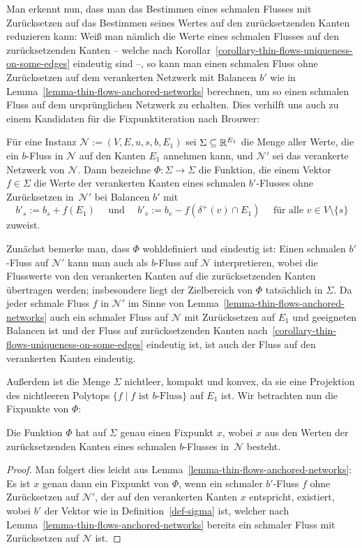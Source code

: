 Man erkennt nun, dass man das Bestimmen eines schmalen Flusses mit Zurücksetzen auf das Bestimmen seines Wertes auf den zurücksetzenden Kanten reduzieren kann:
Weiß man nämlich die Werte eines schmalen Flusses auf den zurücksetzenden Kanten -- welche nach Korollar~\ref{corollary-thin-flows-uniqueness-on-some-edges} eindeutig sind --, so kann man einen schmalen Fluss ohne Zurücksetzen auf dem verankerten Netzwerk mit Balancen $b'$ wie in Lemma~\ref{lemma-thin-flows-anchored-networks} berechnen, um so einen schmalen Fluss auf dem ursprünglichen Netzwerk zu erhalten.
Dies verhilft uns auch zu einem Kandidaten für die Fixpunktiteration nach Brouwer:

\begin{definition}\label{def-sigma}
	Für eine \problemThinFlow Instanz $\mathcal{N}:=(V, E, u, s, b, E_1)$ sei $\Sigma\subseteq \mathbb{R}^{E_1}$ die Menge aller Werte, die ein $b$-Fluss in $\mathcal{N}$ auf den Kanten $E_1$ annehmen kann, und $\mathcal{N}'$ sei das verankerte Netzwerk von $\mathcal{N}$.
	Dann bezeichne $\Phi: \Sigma \rightarrow \Sigma$ die Funktion, die einem Vektor $f\in\Sigma$ die Werte der verankerten Kanten eines schmalen $b'$-Flusses ohne Zurücksetzen in~$\mathcal{N}'$ bei Balancen $b'$ mit
	\[
	b'_s := b_s + f(E_1) \text{~~~ und ~~~} b'_v := b_v - f( \delta^+(v)\cap E_1) \text{~~~ für alle $v\in V\setminus \{ s \}$}
	\]
	zuweist.
\end{definition}

Zunächst bemerke man, dass $\Phi$ wohldefiniert und eindeutig ist:
Einen schmalen $b'$-Fluss auf $\mathcal{N}'$ kann man auch als $b$-Fluss auf $\mathcal{N}$ interpretieren, wobei die Flusswerte von den verankerten  Kanten auf die zurücksetzenden Kanten übertragen werden; insbesondere liegt der Zielbereich von $\Phi$ tatsächlich in $\Sigma$.
Da jeder schmale Fluss $f$ in $\mathcal{N}'$ im Sinne von Lemma~\ref{lemma-thin-flows-anchored-networks} auch ein schmaler Fluss auf $\mathcal{N}$ mit Zurücksetzen auf $E_1$ und geeigneten Balancen ist und der Fluss auf zurücksetzenden Kanten nach~\ref{corollary-thin-flows-uniqueness-on-some-edges} eindeutig ist, ist auch der Fluss auf den verankerten Kanten eindeutig.

Außerdem ist die Menge $\Sigma$ nichtleer, kompakt und konvex, da sie eine Projektion des nichtleeren Polytops $\{ f \mid \text{$f$ ist $b$-Fluss} \}$ auf $E_1$ ist.
Wir betrachten nun die Fixpunkte von $\Phi$:
\begin{proposition}
	Die Funktion $\Phi$ hat auf $\Sigma$ genau einen Fixpunkt $x$, wobei $x$ aus den Werten der zurücksetzenden Kanten eines schmalen $b$-Flusses in~$\mathcal{N}$ besteht.
\end{proposition}
\begin{proof}
	Man folgert dies leicht aus Lemma~\ref{lemma-thin-flows-anchored-networks}:
	Es ist $x$ genau dann ein Fixpunkt von $\Phi$, wenn ein schmaler $b'$-Fluss $f$ ohne Zurücksetzen auf $\mathcal{N}'$, der auf den verankerten Kanten $x$ entspricht, existiert, wobei $b'$ der Vektor wie in Definition~\ref{def-sigma} ist, welcher nach Lemma~\ref{lemma-thin-flows-anchored-networks} bereits ein schmaler Fluss mit Zurücksetzen auf $\mathcal{N}$ ist.	
\end{proof}

